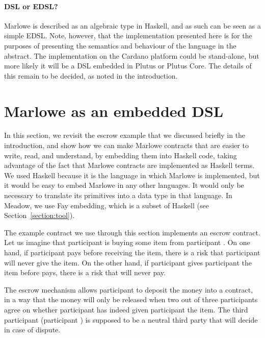 \documentclass[runningheads]{llncs}
\begin{document}
{\paragraph{DSL or EDSL?}

Marlowe is described as an algebraic  type in Haskell, and as such can be seen as a simple EDSL. 
Note, however, that the implementation presented here is for the purposes of presenting the semantics and behaviour of 
the language in the abstract. The implementation on the Cardano platform could be stand-alone, but more likely it will 
be a DSL embedded in Plutus or Plutus Core. The details of this remain to be decided, as noted in the introduction.

} %

\section{Marlowe as an embedded DSL}
\label{section:example-escrow}

In this section, we revisit the escrow example that we discussed briefly in the introduction, and show how we can make 
Marlowe contracts that are easier to write, read, and understand, by embedding them into Haskell code, taking advantage 
of the fact that Marlowe contracts are implemented as Haskell terms. We used Haskell because it is the language in 
which Marlowe is implemented, but it would be easy to embed Marlowe in any other languages. It would only be necessary 
to translate its primitives into a data type in that language. In Meadow, we use Fay embedding, which is a subset of 
Haskell (see Section~\ref{section:tool}).

The example contract we use through this section implements an escrow contract. Let us imagine that participant 
 is buying some item from participant . On one hand, if participant  
pays before receiving the item, there is a risk that participant  will never give  the 
item. On the other hand, if participant  gives participant  the item before 
 pays,  there is a risk that  will never pay.

The escrow mechanism allows participant  to deposit the money into a contract, in a way that the money 
will only be released when two out of three participants agree on whether participant  has indeed given 
participant  the item. The third participant (participant ) is supposed to be a 
neutral third party that will decide in case of dispute.
\end{document}
